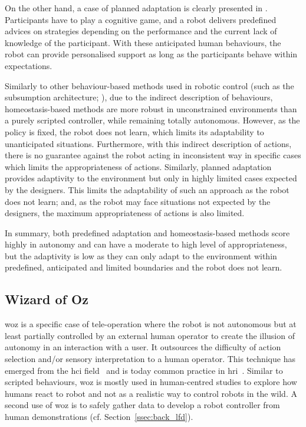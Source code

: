 On the other hand, a case of planned adaptation is clearly presented in \citet{leyzberg2014personalizing}. Participants have to play a cognitive game,  and a robot delivers predefined advices on strategies depending on the performance and the current lack of knowledge of the participant. With these anticipated human behaviours, the robot can provide personalised support as long as the participants behave within expectations. 

Similarly to other behaviour-based methods used in robotic control (such as the subsumption architecture; \citealt{brooks1986robust}), due to the indirect description of behaviours, homeostasis-based methods are more robust in unconstrained environments than a purely scripted controller, while remaining totally autonomous. However, as the policy is fixed, the robot does not learn, which limits its adaptability to unanticipated situations. Furthermore, with this indirect description of actions, there is no guarantee against the robot acting in inconsistent way in specific cases which limits the appropriateness of actions. Similarly, planned adaptation provides adaptivity to the environment but only in highly limited cases expected by the designers. This limits the adaptability of such an approach as the robot does not learn; and, as the robot may face situations not expected by the designers, the maximum appropriateness of actions is also limited.

In summary, both predefined adaptation and homeostasis-based methods score highly in autonomy and can have a moderate to high level of appropriateness, but the adaptivity is low as they can only adapt to the environment within predefined, anticipated and limited boundaries and the robot does not learn.

\subsection{Wizard of Oz} \label{subsec:WoZ}

\acrfull{woz} is a specific case of tele-operation where the robot is not autonomous but at least partially controlled by an external human operator to create the illusion of autonomy in an interaction with a user. It outsources the difficulty of action selection and/or sensory interpretation to a human operator. This technique has emerged from the \gls{hci} field~\citep{kelley1983empirical} and is today common practice in \gls{hri}~\citep{riek2012wizard}. Similar to scripted behaviours, \gls{woz} is mostly used in human-centred studies to explore how humans react to robot and not as a realistic way to control robots in the wild. A second use of \gls{woz} is to safely gather data to develop a robot controller from human demonstrations (cf. Section~\ref{ssec:back_lfd}).

